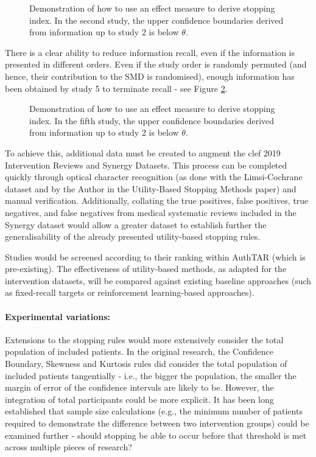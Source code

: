 \documentclass[10pt,oneside]{book}
\begin{document}
\begin{figure}
    \centering
    
    \caption{Demonstration of how to use an effect measure to derive stopping index. In the second study, the upper confidence boundaries derived from information up to study 2 is below $\theta$.}
    \label{fig:culm_smd}
\end{figure}

There is a clear ability to reduce information recall, even if the information is presented in different orders. Even if the study order is randomly permuted (and hence, their contribution to the SMD is randomised), enough information has been obtained by study 5 to terminate recall -  see Figure \ref{fig:aggrevated_stop}.

\begin{figure}
    \centering
    
    \caption{Demonstration of how to use an effect measure to derive stopping index. In the fifth study, the upper confidence boundaries derived from information up to study 2 is below $\theta$.}
    \label{fig:aggrevated_stop}
\end{figure}

To achieve this, additional data must be created to augment the \gls*{clef} 2019 Intervention Reviews and Synergy Datasets. This process can be completed quickly through optical character recognition (as done with the Limsi-Cochrane dataset and by the Author in the Utility-Based Stopping Methods paper) and manual verification. Additionally, collating the true positives, false positives, true negatives, and false negatives from medical systematic reviews included in the Synergy dataset would allow a greater dataset to establish further the generalisability of the already presented utility-based stopping rules.

Studies would be screened according to their ranking within AuthTAR (which is pre-existing). The effectiveness of utility-based methods, as adapted for the intervention datasets, will be compared against existing baseline approaches (such as fixed-recall targets or reinforcement learning-based approaches).

\paragraph{Experimental variations:}
 Extensions to the stopping rules would more extensively consider the total population of included patients. In the original research, the Confidence Boundary, Skewness and Kurtosis rules did consider the total population of included patients tangentially - i.e., the bigger the population, the smaller the margin of error of the confidence intervals are likely to be. However, the integration of total participants could be more explicit. It has been long established that sample size calculations (e.g., the minimum number of patients required to demonstrate the difference between two intervention groups) could be examined further - should stopping be able to occur before that threshold is met across multiple pieces of research? 
\end{document}
